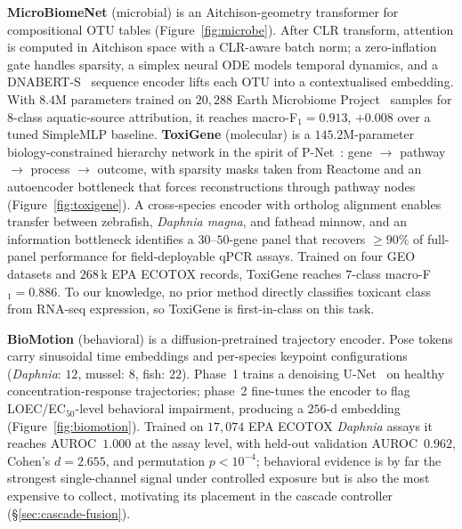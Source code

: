 \documentclass{article}
\begin{document}
\textbf{MicroBiomeNet} (microbial) is an Aitchison-geometry transformer for compositional OTU tables (Figure~\ref{fig:microbe}). After CLR transform, attention is computed in Aitchison space with a CLR-aware batch norm; a zero-inflation gate handles sparsity, a simplex neural ODE models temporal dynamics, and a DNABERT-S~\citep{zhou2024dnaberts} sequence encoder lifts each OTU into a contextualised embedding. With $8.4$M parameters trained on $20{,}288$ Earth Microbiome Project~\citep{thompson2017earthmicrobiome} samples for 8-class aquatic-source attribution, it reaches macro-F$_1\!=\!0.913$, $+0.008$ over a tuned SimpleMLP baseline. \textbf{ToxiGene} (molecular) is a $145.2$M-parameter biology-constrained hierarchy network in the spirit of P-Net~\citep{elmarakeby2021pnet}: gene $\rightarrow$ pathway $\rightarrow$ process $\rightarrow$ outcome, with sparsity masks taken from Reactome and an autoencoder bottleneck that forces reconstructions through pathway nodes (Figure~\ref{fig:toxigene}). A cross-species encoder with ortholog alignment enables transfer between zebrafish, \emph{Daphnia magna}, and fathead minnow, and an information bottleneck identifies a $30$--$50$-gene panel that recovers $\geq\!90\%$ of full-panel performance for field-deployable qPCR assays. Trained on four GEO datasets and $268$\,k EPA ECOTOX records, ToxiGene reaches $7$-class macro-F$_1\!=\!0.886$. To our knowledge, no prior method directly classifies toxicant class from RNA-seq expression, so ToxiGene is first-in-class on this task.

\textbf{BioMotion} (behavioral) is a diffusion-pretrained trajectory encoder. Pose tokens carry sinusoidal time embeddings and per-species keypoint configurations (\emph{Daphnia}: $12$, mussel: $8$, fish: $22$). Phase~1 trains a denoising U-Net~\citep{ho2020ddpm} on healthy concentration-response trajectories; phase~2 fine-tunes the encoder to flag LOEC/EC$_{50}$-level behavioral impairment, producing a $256$-d embedding (Figure~\ref{fig:biomotion}). Trained on $17{,}074$ EPA ECOTOX \emph{Daphnia} assays it reaches AUROC~$1.000$ at the assay level, with held-out validation AUROC~$0.962$, Cohen's $d\!=\!2.655$, and permutation $p\!<\!10^{-4}$; behavioral evidence is by far the strongest single-channel signal under controlled exposure but is also the most expensive to collect, motivating its placement in the cascade controller (\S\ref{sec:cascade-fusion}).
\end{document}

